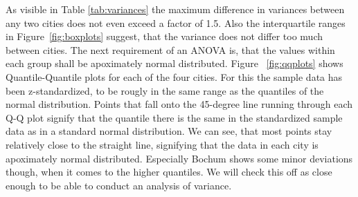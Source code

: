 \documentclass[12 pt]{scrartcl}
\begin{document}
As visible in Table \ref{tab:variances} the maximum difference in variances between any two cities does not even exceed a factor of 1.5. Also the interquartile ranges in Figure~\ref{fig:boxplots} suggest, that the variance does not differ too much between cities.
The next requirement of an ANOVA is, that the values within each group shall be apoximately normal distributed. Figure ~\ref{fig:qqplots} shows Quantile-Quantile plots for each of the four cities. For this the sample data has been z-standardized, to be rougly in the same range as the quantiles of the normal distribution. Points that fall onto the 45-degree line running through each Q-Q plot signify that the quantile there is the same in the standardized sample data as in a standard normal distribution.
We can see, that most points stay relatively close to the straight line, signifying that the data in each city is apoximately normal distributed. Especially Bochum shows some minor deviations though, when it comes to the higher quantiles.
We will check this off as close enough to be able to conduct an analysis of variance.
\end{document}
